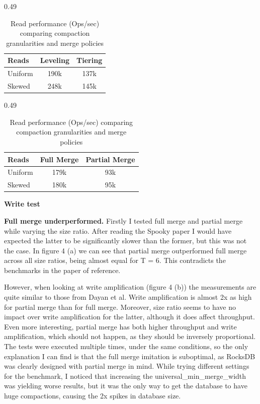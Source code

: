 \documentclass[sigconf]{acmart}
\begin{document}
\begin{table}[t] 
\centering

\begin{subtable}[t]{0.49\textwidth}
    \centering
    \caption{Leveling vs Tiering}
    \begin{tabular}{|l|c|c|} 
    \hline
    \textbf{Reads} & \textbf{Leveling} & \textbf{Tiering} \\ \hline
    Uniform & 190k & 137k \\ \hline
    Skewed  & 248k  & 145k \\ \hline
    \end{tabular}
\end{subtable}
\hfill
\begin{subtable}[t]{0.49\textwidth}
    \centering
    \caption{Full Merge vs Partial Merge}
    \begin{tabular}{|l|c|c|} 
    \hline
    \textbf{Reads} & \textbf{Full Merge} & \textbf{Partial Merge} \\ \hline
    Uniform & 179k & 93k \\ \hline
    Skewed  & 180k  & 95k \\ \hline
    \end{tabular}
\end{subtable}

\vspace{10pt} %
\caption{Read performance (Ops/sec) comparing compaction granularities and merge policies}
\label{tab:read_performance_comparison}
\end{table}
\textbf{Write test}

\textbf{Full merge underperformed.} Firstly I tested full merge and partial merge while varying the size ratio. After reading the Spooky\cite{Spooky}  paper I would have expected the latter to be significantly slower than the former, but this was not the case. In figure 4 (a) we can see that partial merge outperformed full merge across all size ratios, being almost equal for T = 6. This contradicts the benchmarks in the paper of reference. 

However, when looking at write amplification (figure 4 (b)) the measurements are quite similar to those from Dayan et al. Write amplification is almost 2x as high for partial merge than for full merge. Moreover, size ratio seems to have no impact over write amplification for the latter, although it does affect throughput. Even more interesting, partial merge has both higher throughput and write amplification, which should not happen, as they should be inversely proportional. The tests were executed multiple times, under the same conditions, so the only explanation I can find is that the full merge imitation is suboptimal, as RocksDB was clearly designed with partial merge in mind. While trying different settings for the benchmark, I noticed that increasing the universal\_min\_merge\_width was yielding worse results, but it was the only way to get the database to have huge compactions, causing the 2x spikes in database size.
\end{document}

